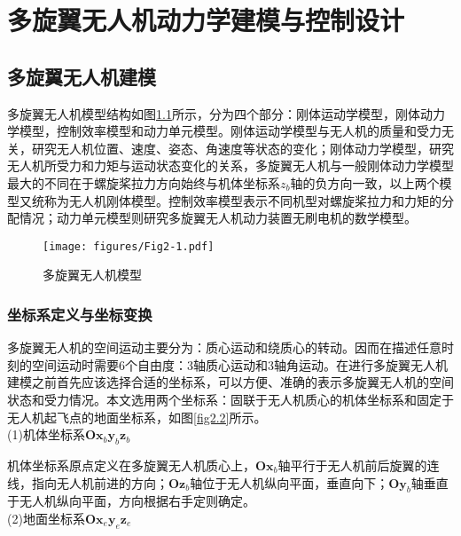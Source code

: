 
\chapter{多旋翼无人机动力学建模与控制设计}
\label{chap:control design}

\section{多旋翼无人机建模}
多旋翼无人机模型结构如图\ref{fig2.1}所示，分为四个部分：刚体运动学模型，刚体动力学模型，控制效率模型和动力单元模型\upcite{[2.1]}。刚体运动学模型与无人机的质量和受力无关，研究无人机位置、速度、姿态、角速度等状态的变化；刚体动力学模型，研究无人机所受力和力矩与运动状态变化的关系，多旋翼无人机与一般刚体动力学模型最大的不同在于螺旋桨拉力方向始终与机体坐标系$z_b$轴的负方向一致，以上两个模型又统称为无人机刚体模型。控制效率模型表示不同机型对螺旋桨拉力和力矩的分配情况；动力单元模型则研究多旋翼无人机动力装置无刷电机的数学模型。
\begin{figure}[h]
\centering
\texttt{[image: figures/Fig2-1.pdf]}
\caption{多旋翼无人机模型}
\label{fig2.1}
\end{figure}

\subsection{坐标系定义与坐标变换}
多旋翼无人机的空间运动主要分为：质心运动和绕质心的转动。因而在描述任意时刻的空间运动时需要6个自由度：3轴质心运动和3轴角运动。在进行多旋翼无人机建模之前首先应该选择合适的坐标系，可以方便、准确的表示多旋翼无人机的空间状态和受力情况\upcite{[2.2]}。本文选用两个坐标系：固联于无人机质心的机体坐标系和固定于无人机起飞点的地面坐标系，如图\ref{fig2.2}所示。\\
(1)机体坐标系$\boldsymbol{O} \boldsymbol{x}_b \boldsymbol{y}_b \boldsymbol{z}_b$

机体坐标系原点定义在多旋翼无人机质心上，$\boldsymbol{O} \boldsymbol{x}_b$轴平行于无人机前后旋翼的连线，指向无人机前进的方向；$\boldsymbol{O} \boldsymbol{z}_b$轴位于无人机纵向平面，垂直向下；$\boldsymbol{O} \boldsymbol{y}_b$轴垂直于无人机纵向平面，方向根据右手定则确定。 \\ 
(2)地面坐标系$\boldsymbol{O} \boldsymbol{x}_e \boldsymbol{y}_e \boldsymbol{z}_e$

